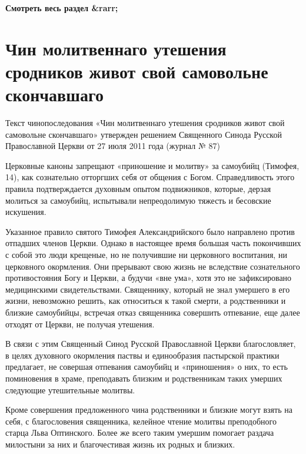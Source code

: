 \mychapterending


\bfseries Смотреть весь раздел &rarr;\normalfont{} 

\section{Чин молитвеннаго утешения сродников живот свой самовольне скончавшаго}
 

Текст чинопоследования «Чин молитвеннаго утешения сродников живот свой самовольне скончавшаго» утвержден решением Священного Синода Русской Православной Церкви от 27 июля 2011 года (журнал № 87)


Церковные каноны запрещают «приношение и молитву» за самоубийц (Тимофея, 14), как сознательно отторгших себя от общения с Богом. Справедливость этого правила подтверждается духовным опытом подвижников, которые, дерзая молиться за самоубийц, испытывали непреодолимую тяжесть и бесовские искушения.


Указанное правило святого Тимофея Александрийского было направлено против отпадших членов Церкви. Однако в настоящее время большая часть покончивших с собой это люди крещеные, но не получившие ни церковного воспитания, ни церковного окормления. Они прерывают свою жизнь не вследствие сознательного противостояния Богу и Церкви, а будучи «вне ума», хотя это не зафиксировано медицинскими свидетельствами. Священнику, который не знал умершего в его жизни, невозможно решить, как относиться к такой смерти, а родственники и близкие самоубийцы, встречая отказ священника совершить отпевание, еще далее отходят от Церкви, не получая утешения.


В связи с этим Священный Синод Русской Православной Церкви благословляет, в целях духовного окормления паствы и единообразия пастырской практики предлагает, не совершая отпевания самоубийц и «приношения» о них, то есть поминовения в храме, преподавать близким и родственникам таких умерших следующие утешительные молитвы.


Кроме совершения предложенного чина родственники и близкие могут взять на себя, с благословения священника, келейное чтение молитвы преподобного старца Льва Оптинского. Более же всего таким умершим помогает раздача милостыни за них и благочестивая жизнь их родных и близких.





